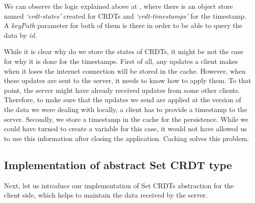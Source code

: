 We can observe the logic explained above at , where there is an object store named \textit{`crdt-states'} created for CRDTs and \textit{`crdt-timestamps'} for the timestamp. A \textit{keyPath} parameter for both of them is there in order to be able to query the data by \textit{id}. 

While it is clear why do we store the states of CRDTs, it might be not the case for why it is done for the timestamps. First of all, any updates a client makes when it loses the internet connection will be stored in the cache. However, when these updates are sent to the server, it needs to know how to apply them. To that point, the server might have already received updates from some other clients. Therefore, to make sure that the updates we send are applied at the version of the data we were dealing with locally, a client has to provide a timestamp to the server. Secondly, we store a timestamp in the cache for the persistence. While we could have turned to create a variable for this case, it would not have allowed us to use this information after closing the application. Caching solves this problem.

\subsection*{Implementation of abstract Set CRDT type}

Next, let us introduce our implementation of Set CRDTs abstraction for the client side, which helps to maintain the data received by the server.

